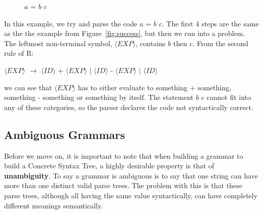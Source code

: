 \documentclass[ %
                    author={Jonathan Rankin},
                supervisor={Dr. David May, Dr. Ian Holyer},
                    degree={MEng},
                     title={CodeTouch},
                  subtitle={A Revolutionary Way To Program Real Code On Touch Screen Devices},
                      type={enterprise},
                      year={2015 } ]{dissertation}
\begin{document}
\begin{itemize}
\begin{figure}[h]
\begin{subfigure}{.5\textwidth}
\end{subfigure}
\caption{$a$ = $b$ $c$}
\label{fig:test}
\end{figure}

In this example, we try and parse the code $a$ = $b$ $c$. The first 4 steps are the same as the the example from Figure~\ref{fig:success}, but then we run into a problem. The leftmost non-terminal symbol,  $\langle EXP \rangle $, contains $b$ then $c$. From the second rule of R:

\begin{center}
$\langle EXP \rangle$ $\rightarrow$  $\langle ID \rangle$ + $\langle EXP \rangle$  $|$  $\langle ID \rangle$ - $\langle EXP \rangle$ $|$ $\langle ID \rangle$ 
\end{center}

we can see that $\langle EXP \rangle$ has to either evaluate to something + something, something - something or something by itself. The statement $b$ $c$ cannot fit into any of these categories, so the parser declares the code not syntactically correct. 


\end{itemize}

\subsection{Ambiguous Grammars}
Before we move on, it is important to note that when building a grammar to build a Concrete Syntax Tree, a highly desirable property is that of \textbf{unambiguity}. To say a grammar is ambiguous is to say that one string can have more than one distinct valid parse trees. The problem with this is that these parse trees, although all having the same value syntactically, can have completely different meanings semantically. 
\end{document}

